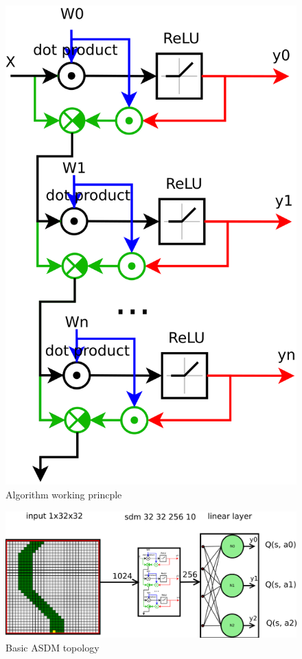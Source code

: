 \documentclass[10pt,a4paper]{article}
\begin{document}
\begin{figure}[!htb]
  \centering
  \includegraphics[scale=0.13]{../diagrams/features_layer_01.png}
  \caption{Algorithm working princple}
  \label{img:Algorithm working princple}
\end{figure}


\begin{figure}[!htb]
  \centering
  \includegraphics[scale=0.18]{../diagrams/convolution_01.png}
  \caption{Basic ASDM topology}
  \label{img:Basic ASDM topology}
\end{figure}
\end{document}
